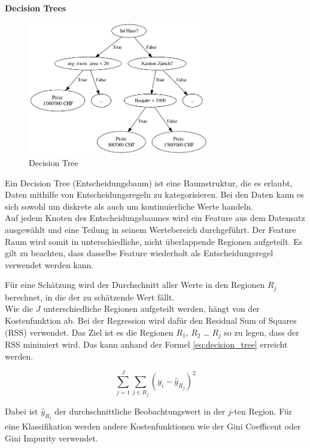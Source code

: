 \textbf{Decision Trees}

\begin{figure}[h]\label{fig:decision_tree}
  \centering
  \includegraphics[width=0.7\textwidth]{images/decision_tree.png}
  \caption[Decision Tree]{Decision Tree}
\end{figure}

Ein Decision Tree (Entscheidungsbaum) ist eine Baumstruktur, die es erlaubt, Daten mithilfe von Entscheidungsregeln zu kategorisieren. Bei den Daten kann es sich sowohl um diskrete als auch um kontinuierliche Werte handeln.\\
Auf jedem Knoten des Entscheidungsbaumes wird ein Feature aus dem Datensatz ausgewählt und eine Teilung in seinem Wertebereich durchgeführt. Der Feature Raum wird somit in unterschiedliche, nicht überlappende Regionen aufgeteilt. Es gilt zu beachten, dass dasselbe Feature wiederholt als Entscheidungsregel verwendet werden kann.

Für eine Schätzung wird der Durchschnitt aller Werte in den Regionen $R_j$ berechnet, in die der zu schätzende Wert fällt.\\
Wie die  $J$ unterschiedliche Regionen aufgeteilt werden, hängt von der Kostenfunktion ab. Bei der Regression wird dafür den Residual Sum of Squares (RSS) verwendet. Das Ziel ist es die Regionen $R_1$, $R_2$ … $R_j$ so zu legen, dass der RSS minimiert wird. Das kann anhand der Formel \eqref{eq:decision_tree} erreicht werden.

\begin{equation}
\label{eq:decision_tree}
\sum_{j=1}^{J} \sum_{j \in R_j}^{} (y_i - \hat{y}_{R_j})^2
\end{equation}

Dabei ist $\hat{y}_{R_j}$ der durchschnittliche Beobachtungswert in der $j$-ten Region. Für eine Klassifikation werden andere Kostenfunktionen wie der Gini Coefficent oder Gini Impurity verwendet.

